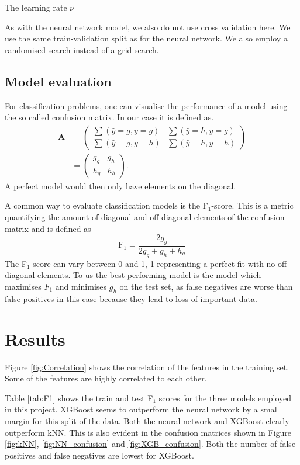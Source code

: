 \documentclass[a4paper, 11pt, twocolumn]{article}
\begin{document}
The learning rate $\nu$

As with the neural network model, we also do not use cross validation here. We 
use the same train-validation split as for the neural network. We also employ
a randomised search instead of a grid search.

\subsection{Model evaluation}
For classification problems, one can visualise the performance of a model using the so called confusion matrix. In our case it is defined as.
\begin{align}
\bm{A}&=\begin{pmatrix}
\sum (\hat{y}=g, y=g) & \sum(\hat{y}=h, y=g) \\
\sum(\hat{y}=g, y=h) & \sum(\hat{y}=h, y=h)
\end{pmatrix}\nonumber \\
&=\begin{pmatrix}
g_g & g_h \\
h_g & h_h
\end{pmatrix}.
\label{eq:Confusion}
\end{align}
A perfect model would then only have elements on the diagonal.

A common way to evaluate classification models is the F$_1$-score. This is a 
metric quantifying the amount of diagonal and off-diagonal elements of the 
confusion matrix and is defined as 
\begin{equation}
\text{F}_1=\frac{2 g_g}{2g_g + g_h + h_g}
\label{eq:F1}
\end{equation} 
The F$_1$ score can vary between 0 and 1, 1 representing a perfect fit with 
no off-diagonal elements. To us the best performing model is the model which 
maximises $F_1$ and minimises $g_h$ on the test set, as false negatives are 
worse than false positives in this case because they lead to loss of important 
data.

\section{Results}

Figure \ref{fig:Correlation} shows the correlation of the features in the
training set. Some of the features are highly correlated to each other.

Table \ref{tab:F1} shows the train and test F$_1$
scores for the three models employed in this project.
XGBoost seems to outperform the neural network by a
small margin for this split of the data. Both the
neural network and XGBoost clearly outperform kNN.
This is also evident in the confusion matrices shown
in Figure \ref{fig:kNN}, \ref{fig:NN_confusion} and
\ref{fig:XGB_confusion}. Both the number of false
positives and false negatives are lowest for XGBoost.
\end{document}
